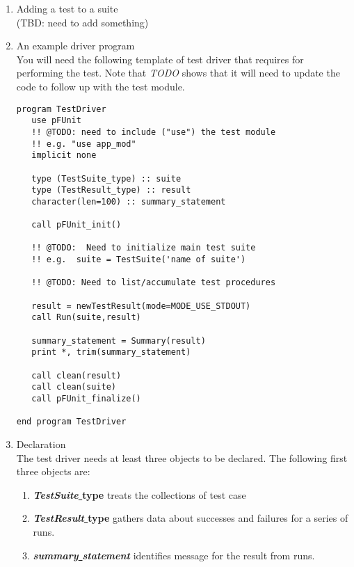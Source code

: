\documentclass[10pt]{article}
\begin{document}
\begin{enumerate}
\item Adding a test to a suite\\
(TBD: need to add something)
\item An example driver program\\
You will need the following template of test driver that requires for
performing the test.  Note that \emph{TODO} shows that it will need to
update the code to follow up with the test module.

\begin{verbatim}
program TestDriver
   use pFUnit
   !! @TODO: need to include ("use") the test module
   !! e.g. "use app_mod"
   implicit none

   type (TestSuite_type) :: suite
   type (TestResult_type) :: result
   character(len=100) :: summary_statement

   call pFUnit_init()

   !! @TODO:  Need to initialize main test suite
   !! e.g.  suite = TestSuite('name of suite')

   !! @TODO: Need to list/accumulate test procedures

   result = newTestResult(mode=MODE_USE_STDOUT)
   call Run(suite,result)

   summary_statement = Summary(result)
   print *, trim(summary_statement)

   call clean(result)
   call clean(suite)
   call pFUnit_finalize()
  
end program TestDriver
\end{verbatim}

\item Declaration \\
The test driver needs at least three objects to be declared.   The following first three objects are:

\begin{enumerate}
\item \textbf{\emph{TestSuite}\underline{ }type} treats the collections of test case
\item \textbf{\emph{TestResult}\underline{ }type} gathers data about successes and failures for a series of runs.
\item \textbf{\emph{summary\underline{ }statement}} identifies message for the result from runs.  
\end{enumerate}


\end{enumerate}
\end{document}
